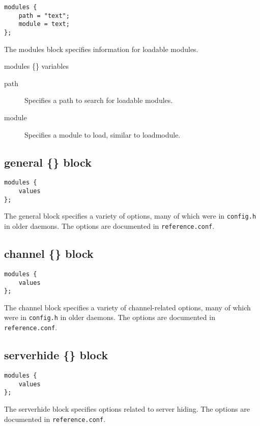 \begin{verbatim}
modules {
	path = "text";
	module = text;
};\end{verbatim}

	The modules block specifies information for loadable modules.


{\sc modules \{\} variables}
\nopagebreak

\noindent
\begin{description}
\item[{path}]
	Specifies a path to search for loadable modules.

\item[{module}]
	Specifies a module to load, similar to loadmodule.

\end{description}


\subsection{general \{\} block}

\begin{verbatim}
modules {
	values
};\end{verbatim}

	The general block specifies a variety of options, many of which were in
	\nolinkurl{config.h} in older daemons. The options are documented in
	\nolinkurl{reference.conf}.


\subsection{channel \{\} block}

\begin{verbatim}
modules {
	values
};\end{verbatim}

	The channel block specifies a variety of channel-{}related options,
	many of which were in \nolinkurl{config.h} in older daemons. The
	options are documented in \nolinkurl{reference.conf}.


\subsection{serverhide \{\} block}

\begin{verbatim}
modules {
	values
};\end{verbatim}

	The serverhide block specifies options related to server hiding. The
	options are documented in \nolinkurl{reference.conf}.

